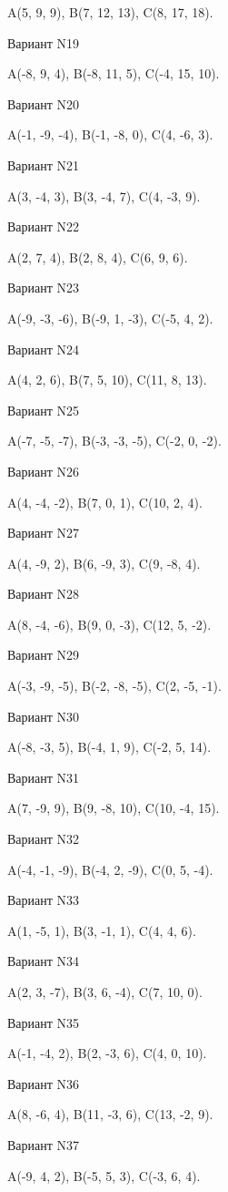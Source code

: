 \documentclass[11pt]{report}
\begin{document}
A(5, 9, 9), B(7, 12, 13), C(8, 17, 18).

Вариант N19

A(-8, 9, 4), B(-8, 11, 5), C(-4, 15, 10).

Вариант N20

A(-1, -9, -4), B(-1, -8, 0), C(4, -6, 3).

Вариант N21

A(3, -4, 3), B(3, -4, 7), C(4, -3, 9).

Вариант N22

A(2, 7, 4), B(2, 8, 4), C(6, 9, 6).

Вариант N23

A(-9, -3, -6), B(-9, 1, -3), C(-5, 4, 2).

Вариант N24

A(4, 2, 6), B(7, 5, 10), C(11, 8, 13).

Вариант N25

A(-7, -5, -7), B(-3, -3, -5), C(-2, 0, -2).

Вариант N26

A(4, -4, -2), B(7, 0, 1), C(10, 2, 4).

Вариант N27

A(4, -9, 2), B(6, -9, 3), C(9, -8, 4).

Вариант N28

A(8, -4, -6), B(9, 0, -3), C(12, 5, -2).

Вариант N29

A(-3, -9, -5), B(-2, -8, -5), C(2, -5, -1).

Вариант N30

A(-8, -3, 5), B(-4, 1, 9), C(-2, 5, 14).

Вариант N31

A(7, -9, 9), B(9, -8, 10), C(10, -4, 15).

Вариант N32

A(-4, -1, -9), B(-4, 2, -9), C(0, 5, -4).

Вариант N33

A(1, -5, 1), B(3, -1, 1), C(4, 4, 6).

Вариант N34

A(2, 3, -7), B(3, 6, -4), C(7, 10, 0).

Вариант N35

A(-1, -4, 2), B(2, -3, 6), C(4, 0, 10).

Вариант N36

A(8, -6, 4), B(11, -3, 6), C(13, -2, 9).

Вариант N37

A(-9, 4, 2), B(-5, 5, 3), C(-3, 6, 4).
\end{document}
